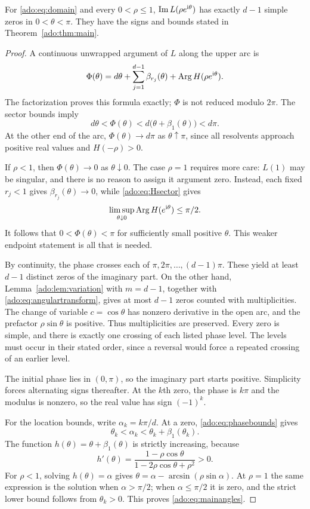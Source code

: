 \begin{theorem}
\label{ado:thm:angular}
For \eqref{ado:eq:domain} and every $0<\rho\le1$,
$\operatorname{Im} L(\rho e^{\mathrm i\theta})$ has exactly $d-1$ simple zeros in
$0<\theta<\pi$. They have the signs and bounds stated in
Theorem~\ref{ado:thm:main}.
\end{theorem}
\begin{proof}
A continuous unwrapped argument of $L$ along the upper arc is
\begin{equation}\label{ado:eq:unwrappedphase}
 \Phi(\theta)=d\theta+
       \sum_{j=1}^{d-1}\beta_{r_j}(\theta)
       +\operatorname{Arg} H(\rho e^{\mathrm i\theta}).
\end{equation}
The factorization proves this formula exactly; $\Phi$ is not reduced
modulo $2\pi$. The sector bounds imply
\begin{equation}\label{ado:eq:phasebounds}
 d\theta<\Phi(\theta)<d\bigl(\theta+\beta_1(\theta)\bigr)<d\pi.
\end{equation}
At the other end of the arc, $\Phi(\theta)\to d\pi$ as
$\theta\uparrow\pi$, since all resolvents approach positive real
values and $H(-\rho)>0$.

If $\rho<1$, then $\Phi(\theta)\to0$ as $\theta\downarrow0$.
The case $\rho=1$ requires more care: $L(1)$ may be singular, and
there is no reason to assign it argument zero. Instead, each fixed
$r_j<1$ gives $\beta_{r_j}(\theta)\to0$, while
\eqref{ado:eq:Hsector} gives
\[
 \limsup_{\theta\downarrow0}\operatorname{Arg} H(e^{\mathrm i\theta})\le\pi/2.
\]
It follows that $0<\Phi(\theta)<\pi$ for sufficiently small positive
$\theta$. This weaker endpoint statement is all that is needed.

By continuity, the phase crosses each of $\pi,2\pi,\ldots,(d-1)\pi$.
These yield at least $d-1$ distinct zeros of the imaginary part. On the
other hand, Lemma~\ref{ado:lem:variation} with $m=d-1$, together
with \eqref{ado:eq:angulartransform}, gives at most $d-1$ zeros
counted with multiplicities. The change of variable $c=\cos\theta$
has nonzero derivative in the open arc, and the prefactor
$\rho\sin\theta$ is positive. Thus multiplicities are preserved.
Every zero is simple, and there is exactly one crossing of each listed
phase level. The levels must occur in their stated order, since a
reversal would force a repeated crossing of an earlier level.

The initial phase lies in $(0,\pi)$, so the imaginary part starts
positive. Simplicity forces alternating signs thereafter. At the
$k$th zero, the phase is $k\pi$ and the modulus is nonzero, so the real
value has sign $(-1)^k$.

For the location bounds, write $\alpha_k=k\pi/d$. At a zero,
\eqref{ado:eq:phasebounds} gives
\[
 \theta_k<\alpha_k<\theta_k+\beta_1(\theta_k).
\]
The function $h(\theta)=\theta+\beta_1(\theta)$ is strictly
increasing, because
\[
 h'(\theta)=\frac{1-\rho\cos\theta}
                  {1-2\rho\cos\theta+\rho^2}>0.
\]
For $\rho<1$, solving $h(\theta)=\alpha$ gives
$\theta=\alpha-\arcsin(\rho\sin\alpha)$. At $\rho=1$ the same
expression is the solution when $\alpha>\pi/2$; when
$\alpha\le\pi/2$ it is zero, and the strict lower bound follows
from $\theta_k>0$. This proves \eqref{ado:eq:mainangles}.
\end{proof}
